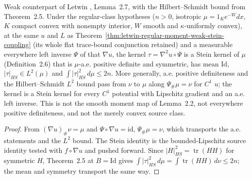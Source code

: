 \begin{theorem}
  \label{thm:letwin-regular-moment-target-stein-kernel}
  \leanok
  Weak counterpart of Letwin \cite{Letwin2026QuadraticKLS}, Lemma~2.7, with the Hilbert--Schmidt bound from Theorem~2.5. Under the regular-class
  hypotheses ($n>0$, isotropic $\mu=1_Ke^{-W}dx$, $K$ compact convex with nonempty interior, $W$ smooth and $\kappa$-uniformly convex), at the
  same $u$ and $L$ as Theorem~\ref{thm:letwin-regular-moment-weak-stein-coupling} (its whole flat trace-bound conjunction retained) and a
  measurable everywhere left inverse $\Psi$ of that $\nabla u$, the kernel $\tau=\nabla^2u\circ\Psi$ is a Stein kernel of $\mu$
  (Definition~2.6) that is $\mu$-a.e. positive definite and symmetric, has mean $\mathrm{Id}$, $|\tau|_{HS}\in L^2(\mu)$ and
  $\int|\tau|_{HS}^2\,d\mu\le2n$. More generally, a.e. positive definiteness and the Hilbert--Schmidt $L^2$ bound pass from $\nu$ to $\mu$ along
  $\Psi_\#\mu=\nu$ for $C^1$ $u$; the kernel is a Stein kernel for every $C^1$ potential with Lipschitz gradient and an a.e. left inverse. This is
  not the smooth moment map of Lemma~2.2, not everywhere positive definiteness, and not the merely convex source class.
\end{theorem}
\begin{proof}
  \leanok
  From $(\nabla u)_\#\nu=\mu$ and $\Psi\circ\nabla u=\mathrm{id}$, $\Psi_\#\mu=\nu$, which transports the a.e. statements and the $L^2$ bound. The
  Stein identity is the bounded-Lipschitz source identity tested with $f\circ\nabla u$ and pushed forward. Since $|H|_{HS}^2=\operatorname{tr}(HH)$
  for symmetric $H$, Theorem~2.5 at $B=\mathrm{Id}$ gives $\int|\tau|_{HS}^2\,d\mu=\int\operatorname{tr}(HH)\,d\nu\le2n$; the mean and symmetry
  transport the same way.
\end{proof}

